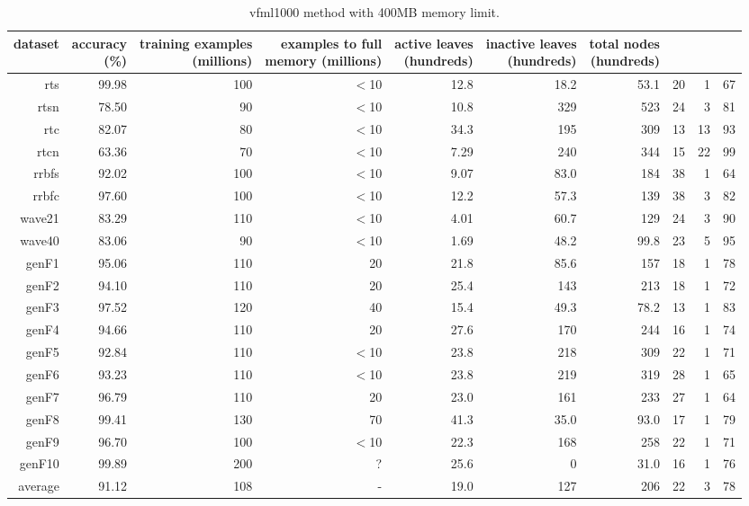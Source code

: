 \clearpage
\begin{table}
\caption{{\sc vfml1000} method with 400MB memory limit.}
\label{tab:vfml1000-400MB}
\centering
\begin{tabular}{|r|r|r|r|r|r|r|r|r|r|}
\hline
dataset	&
\rotatebox{90}{\parbox{9em}{accuracy\\(\%)}} &
\rotatebox{90}{\parbox{9em}{training examples\\(millions)}} &
\rotatebox{90}{\parbox{9em}{examples to full\\memory (millions)}} &
\rotatebox{90}{\parbox{9em}{active leaves\\(hundreds)}} &
\rotatebox{90}{\parbox{9em}{inactive leaves\\(hundreds)}} &
\rotatebox{90}{\parbox{9em}{total nodes\\(hundreds)}} &
\rotatebox{90}{\parbox{9em}{tree depth}}	&
\rotatebox{90}{\parbox{9em}{training speed (\%)}} &
\rotatebox{90}{\parbox{9em}{prediction speed (\%)}} \\
\hline
{\sc rts} & 99.98 & 100 & $<$10 & 12.8 & 18.2 & 53.1 & 20 & 1 & 67 \\
{\sc rtsn} & 78.50 & 90 & $<$10 & 10.8 & 329 & 523 & 24 & 3 & 81 \\
{\sc rtc} & 82.07 & 80 & $<$10 & 34.3 & 195 & 309 & 13 & 13 & 93 \\
{\sc rtcn} & 63.36 & 70 & $<$10 & 7.29 & 240 & 344 & 15 & 22 & 99 \\
{\sc rrbfs} & 92.02 & 100 & $<$10 & 9.07 & 83.0 & 184 & 38 & 1 & 64 \\
{\sc rrbfc} & 97.60 & 100 & $<$10 & 12.2 & 57.3 & 139 & 38 & 3 & 82 \\
{\sc wave21} & 83.29 & 110 & $<$10 & 4.01 & 60.7 & 129 & 24 & 3 & 90 \\
{\sc wave40} & 83.06 & 90 & $<$10 & 1.69 & 48.2 & 99.8 & 23 & 5 & 95 \\
{\sc genF1} & 95.06 & 110 & 20 & 21.8 & 85.6 & 157 & 18 & 1 & 78 \\
{\sc genF2} & 94.10 & 110 & 20 & 25.4 & 143 & 213 & 18 & 1 & 72 \\
{\sc genF3} & 97.52 & 120 & 40 & 15.4 & 49.3 & 78.2 & 13 & 1 & 83 \\
{\sc genF4} & 94.66 & 110 & 20 & 27.6 & 170 & 244 & 16 & 1 & 74 \\
{\sc genF5} & 92.84 & 110 & $<$10 & 23.8 & 218 & 309 & 22 & 1 & 71 \\
{\sc genF6} & 93.23 & 110 & $<$10 & 23.8 & 219 & 319 & 28 & 1 & 65 \\
{\sc genF7} & 96.79 & 110 & 20 & 23.0 & 161 & 233 & 27 & 1 & 64 \\
{\sc genF8} & 99.41 & 130 & 70 & 41.3 & 35.0 & 93.0 & 17 & 1 & 79 \\
{\sc genF9} & 96.70 & 100 & $<$10 & 22.3 & 168 & 258 & 22 & 1 & 71 \\
{\sc genF10} & 99.89 & 200 & ? & 25.6 & 0 & 31.0 & 16 & 1 & 76 \\
\hline
average & 91.12 & 108 &  -  & 19.0 & 127 & 206 & 22 & 3 & 78 \\
\hline
\end{tabular}
\end{table}
